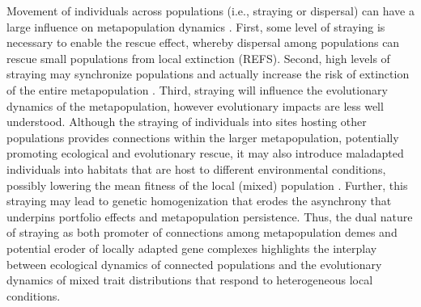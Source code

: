 \documentclass[twocolumn,preprintnumbers,amsmath,amssymb,superscriptaddress]{revtex4}
\begin{document}
Movement of individuals across populations (i.e., straying or dispersal) can have a large influence on metapopulation dynamics  \cite{MilnerGulland:2011vm}. 
First, some level of straying is necessary to enable the rescue effect, whereby dispersal among populations can rescue small populations from local extinction (REFS). 
Second, high levels of straying may synchronize populations and actually increase the risk of extinction of the entire metapopulation \cite{Earn:2000fm}. 
Third, straying will influence the evolutionary dynamics of the metapopulation, however evolutionary impacts are less well understood. 
Although the straying of individuals into sites hosting other populations provides connections within the larger metapopulation, potentially promoting ecological and evolutionary rescue, it may also introduce maladapted individuals into habitats that are host to different environmental conditions, possibly lowering the mean fitness of the local (mixed) population \cite{Muhlfeld:2014hs}. 
Further, this straying may lead to genetic homogenization that erodes the asynchrony that underpins portfolio effects and metapopulation persistence. 
Thus, the dual nature of straying as both promoter of connections among metapopulation demes and potential eroder of locally adapted gene complexes highlights the interplay between ecological dynamics of connected populations and the evolutionary dynamics of mixed trait distributions that respond to heterogeneous local conditions.


\end{document}
